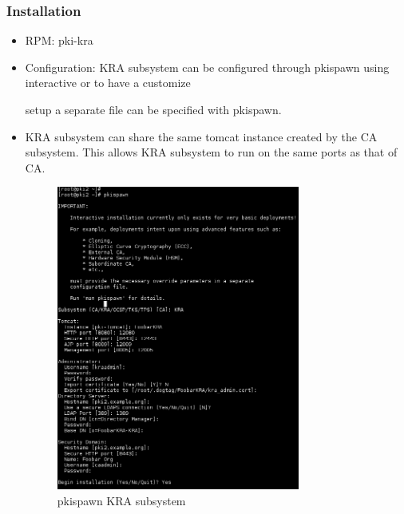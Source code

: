 \documentclass[12pt]{report}
\begin{document}
\subsubsection{Installation}
\begin{itemize}
    \item RPM: pki-kra
    \item Configuration: KRA subsystem can be configured through pkispawn using interactive or to have a customize

        setup a separate file can be specified with pkispawn.

    \item KRA subsystem can share the same tomcat instance created by the CA subsystem. This allows KRA subsystem
        to run on the same ports as that of CA.

        \begin{figure}[H]
            \centering
            \includegraphics[width=80mm]{Images/pkispawn-kra.png}
            \caption{pkispawn KRA subsystem}
        \end{figure}
\end{itemize}
\end{document}
